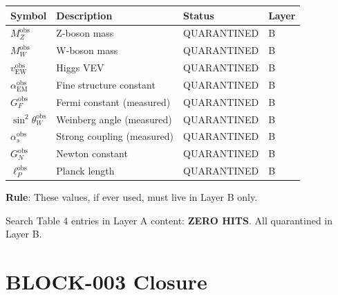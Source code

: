 \documentclass[11pt,a4paper]{article}
\begin{document}
\begin{forbiddenbox}
\label{box:table-external}
\begin{center}
\begin{tabular}{llll}
\toprule
\textbf{Symbol} & \textbf{Description} & \textbf{Status} & \textbf{Layer} \\
\midrule
$M_Z^{\text{obs}}$ & Z-boson mass & QUARANTINED & B \\
$M_W^{\text{obs}}$ & W-boson mass & QUARANTINED & B \\
$v_{\text{EW}}^{\text{obs}}$ & Higgs VEV & QUARANTINED & B \\
$\alpha_{\text{EM}}^{\text{obs}}$ & Fine structure constant & QUARANTINED & B \\
$G_F^{\text{obs}}$ & Fermi constant (measured) & QUARANTINED & B \\
$\sin^2\theta_W^{\text{obs}}$ & Weinberg angle (measured) & QUARANTINED & B \\
$\alpha_s^{\text{obs}}$ & Strong coupling (measured) & QUARANTINED & B \\
$G_N^{\text{obs}}$ & Newton constant & QUARANTINED & B \\
$\ell_P^{\text{obs}}$ & Planck length & QUARANTINED & B \\
\bottomrule
\end{tabular}
\end{center}
\textbf{Rule}: These values, if ever used, must live in Layer B only.
\end{forbiddenbox}

\begin{trapbox}
\label{trap:rt14}
Search Table 4 entries in Layer A content: \textbf{ZERO HITS}. All quarantined in Layer B.
\end{trapbox}

\section{BLOCK-003 Closure}
\label{sec:closure}
\end{document}
